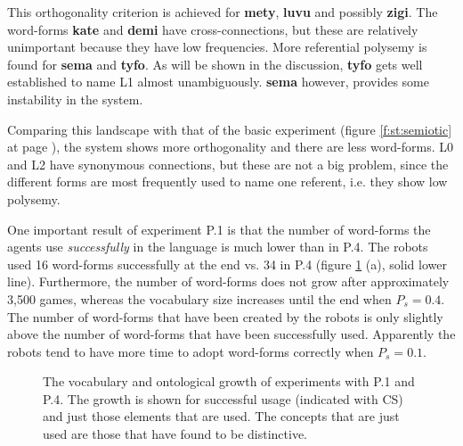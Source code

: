 This orthogonality criterion is achieved for {\bf mety}, {\bf luvu} and possibly {\bf zigi}. The word-forms {\bf kate} and {\bf demi} have cross-connections, but these are relatively unimportant because they have low frequencies. More referential polysemy is found for {\bf sema} and {\bf tyfo}. As will be shown in the discussion, {\bf tyfo} gets well established to name L1 almost unambiguously. {\bf sema} however, provides some instability in the system. 

Comparing this landscape with that of the basic experiment (figure \ref{f:st:semiotic} at page \pageref{f:st:semiotic}), the system shows more orthogonality and there are less word-forms. L0 and L2 have synonymous connections, but these are not a big problem, since the different forms are most frequently used to name one referent, i.e. they show low polysemy.


One important result of experiment P.1 is that the number of word-forms the agents use {\em successfully} in the language is much lower than in P.4. The robots used 16 word-forms successfully at the end vs. 34 in P.4 (figure \ref{f:opt:words} (a), solid lower line). Furthermore, the number of word-forms does not grow after approximately 3,500 games, whereas the vocabulary size increases until the end when $P_s=0.4$. The number of word-forms that have been created by the robots is only slightly above the number of word-forms that have been successfully used. Apparently the robots tend to have more time to adopt word-forms correctly when $P_s=0.1$. 


\begin{figure}
\centering
{}
\caption{The vocabulary and ontological growth of experiments with P.1 and P.4. The growth is shown for successful usage (indicated with CS) and just those elements that are used. The concepts that are just used are those that have found to be distinctive.}
\label{f:opt:words}
\end{figure}

